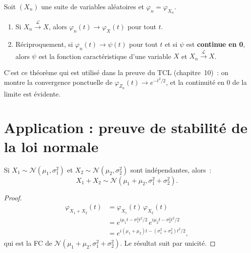\begin{theoreme}
\label{thm:levy}
Soit $(X_n)$ une suite de variables al\'eatoires et $\varphi_n = \varphi_{X_n}$.
\begin{enumerate}[label=(\roman*)]
    \item Si $X_n \xrightarrow{\mathcal{L}} X$, alors $\varphi_n(t) \to \varphi_X(t)$
    pour tout $t$.
    \item R\'eciproquement, si $\varphi_n(t) \to \psi(t)$ pour tout $t$ et si $\psi$
    est \textbf{continue en 0}, alors $\psi$ est la fonction caract\'eristique d'une
    variable $X$ et $X_n \xrightarrow{\mathcal{L}} X$.
\end{enumerate}
\end{theoreme}

\begin{remarque}
C'est ce th\'eor\`eme qui est utilis\'e dans la preuve du TCL (chapitre~10)~: on
montre la convergence ponctuelle de $\varphi_{Z_n}(t) \to e^{-t^2/2}$, et la
continuit\'e en 0 de la limite est \'evidente.
\end{remarque}

\section{Application : preuve de stabilit\'e de la loi normale}

\begin{theoreme}
Si $X_1 \sim \mathcal{N}(\mu_1, \sigma_1^2)$ et
$X_2 \sim \mathcal{N}(\mu_2, \sigma_2^2)$ sont ind\'ependantes, alors~:
\[
    X_1 + X_2 \sim \mathcal{N}(\mu_1 + \mu_2, \sigma_1^2 + \sigma_2^2).
\]
\end{theoreme}

\begin{proof}
\begin{align*}
    \varphi_{X_1+X_2}(t) &= \varphi_{X_1}(t)\, \varphi_{X_2}(t) \\
    &= e^{i\mu_1 t - \sigma_1^2 t^2/2}\, e^{i\mu_2 t - \sigma_2^2 t^2/2} \\
    &= e^{i(\mu_1+\mu_2)t - (\sigma_1^2+\sigma_2^2)t^2/2},
\end{align*}
qui est la FC de $\mathcal{N}(\mu_1+\mu_2, \sigma_1^2+\sigma_2^2)$. Le r\'esultat
suit par unicit\'e.
\end{proof}

